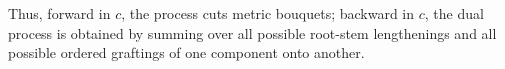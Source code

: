 \documentclass[11pt]{article}
\newtheorem{remark}{Remark}[section]
\begin{document}
Thus, forward in \(c\), the process cuts metric bouquets; backward in \(c\),
the dual process is obtained by summing over all possible root-stem
lengthenings and all possible ordered graftings of one component onto another.
%
%
%
%
%
%
%
%
%
\end{document}
